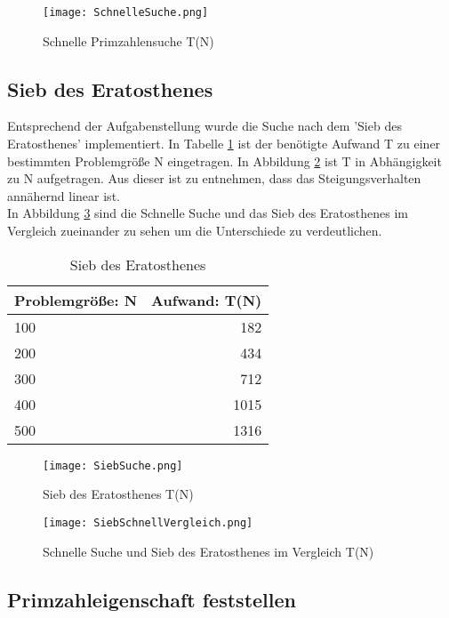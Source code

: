 \begin{figure}[htbp]
\centering
\texttt{[image: SchnelleSuche.png]}
\caption{Schnelle Primzahlensuche T(N)}
\label{fig:schnelleSuche}
\end{figure}


\subsection{Sieb des Eratosthenes}
\label{subsec:SiebSuche}
Entsprechend der Aufgabenstellung wurde die Suche nach dem 'Sieb des Eratosthenes' implementiert.
In Tabelle \ref{tab:siebSuche} ist der benötigte Aufwand T zu einer bestimmten Problemgröße N eingetragen.
In Abbildung \ref{fig:siebSuche} ist T in Abhängigkeit zu N aufgetragen. Aus dieser ist zu entnehmen, dass das Steigungsverhalten annähernd linear ist. \\
In Abbildung \ref{fig:vergleich} sind die Schnelle Suche und das Sieb des Eratosthenes im Vergleich zueinander zu sehen um die Unterschiede zu verdeutlichen.


\begin{table}[htbp]
\caption{Sieb des Eratosthenes}
\label{tab:siebSuche}
\centering
\begin{tabular}{l|r}
Problemgröße: N	&	Aufwand: T(N)	\\
\hline
100				&	182			\\
200				&	434			\\
300				&	712			\\
400				&	1015		\\
500				&	1316		\\
\end{tabular}
\end{table}

\begin{figure}[htbp]
\centering
\texttt{[image: SiebSuche.png]}
\caption{Sieb des Eratosthenes T(N)}
\label{fig:siebSuche}
\end{figure}

\begin{figure}[htbp]
\centering
\texttt{[image: SiebSchnellVergleich.png]}
\caption{Schnelle Suche und Sieb des Eratosthenes im Vergleich T(N)}
\label{fig:vergleich}
\end{figure}

\subsection{Primzahleigenschaft feststellen}
\label{subsec:PrimFeststellen}

